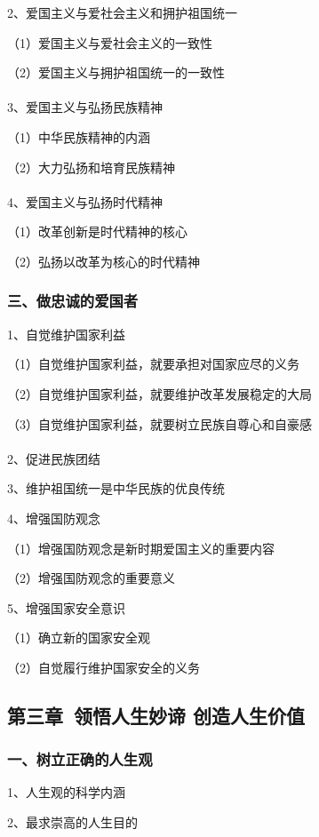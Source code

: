 \documentclass{ctexart}
\begin{document}
2、爱国主义与爱社会主义和拥护祖国统一

（1）爱国主义与爱社会主义的一致性

（2）爱国主义与拥护祖国统一的一致性
\\\\

3、爱国主义与弘扬民族精神

（1）中华民族精神的内涵

（2）大力弘扬和培育民族精神
\\\\

4、爱国主义与弘扬时代精神

（1）改革创新是时代精神的核心

（2）弘扬以改革为核心的时代精神

\subsubsection{三、做忠诚的爱国者}

1、自觉维护国家利益

（1）自觉维护国家利益，就要承担对国家应尽的义务

（2）自觉维护国家利益，就要维护改革发展稳定的大局

（3）自觉维护国家利益，就要树立民族自尊心和自豪感
\\\\

2、促进民族团结

3、维护祖国统一是中华民族的优良传统

4、增强国防观念

（1）增强国防观念是新时期爱国主义的重要内容

（2）增强国防观念的重要意义

5、增强国家安全意识

（1）确立新的国家安全观

（2）自觉履行维护国家安全的义务

\subsection{第三章\ 领悟人生妙谛 创造人生价值}

\subsubsection{一、树立正确的人生观}

1、人生观的科学内涵

2、最求崇高的人生目的
\end{document}
